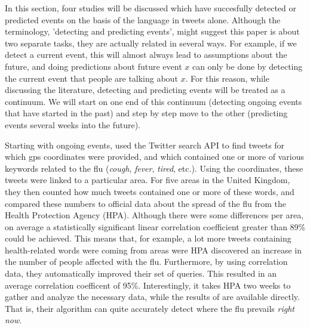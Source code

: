 \documentclass[12pt]{article}
\begin{document}
In this section, four studies will be discussed which have succesfully detected or predicted events on the basis of the language in tweets alone. Although the terminology, 'detecting and predicting events', might suggest this paper is about two separate tasks, they are actually related in several ways. For example, if we detect a current event, this will almost always lead to assumptions about the future, and doing predictions about future event $x$ can only be done by detecting the current event that people are talking about $x$. For this reason, while discussing the literature, detecting and predicting events will be treated as a continuum. We will start on one end of this continuum (detecting ongoing events that have started in the past) and step by step move to the other (predicting events several weeks into the future).

Starting with ongoing events,  used the Twitter search API to find tweets for which gps coordinates were provided, and which contained one or more of various keywords related to the flu (\emph{cough}, \emph{fever}, \emph{tired}, etc.). Using the coordinates, these tweets were linked to a particular area. For five areas in the United Kingdom, they then counted how much tweets contained one or more of these words, and compared these numbers to official data about the spread of the flu from the Health Protection Agency (HPA). Although there were some differences per area, on average a statistically significant linear correlation coefficient greater than 89\% could be achieved. This means that, for example, a lot more tweets containing health-related words were coming from areas were HPA discovered an increase in the number of people affected with the flu. Furthermore, by using correlation data, they automatically improved their set of queries. This resulted in an average correlation coefficent of 95\%.  Interestingly, it takes HPA two weeks to gather and analyze the necessary data, while the results of  are available directly. That is, their algorithm can quite accurately detect where the flu prevails \emph{right now}.
\end{document}
